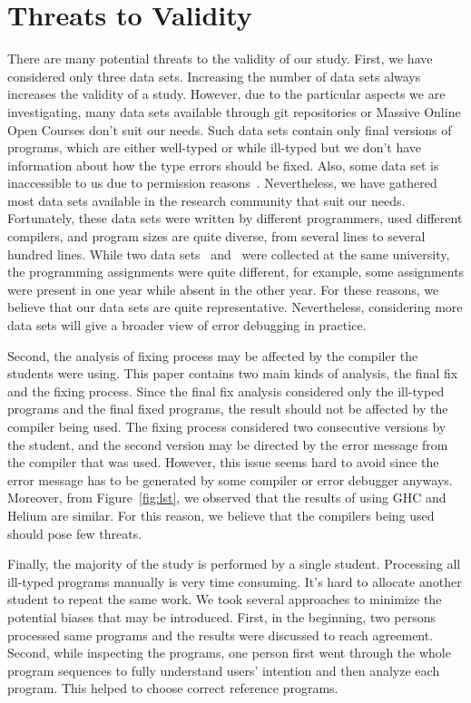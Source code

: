 \documentclass[12pt]{report}	%
\begin{document}
\section{Threats to Validity}
\label{sec:threat}

There are many potential threats to the validity of our study.
First, we have considered only three data sets. Increasing the
number of data sets always increases the validity
of a study. However, due to the particular aspects we are
investigating, many data sets available through git
repositories or Massive Online Open Courses don't
suit our needs. Such data sets contain only final
versions of programs, which are either well-typed or
while ill-typed but we don't have information about
how the type errors should be fixed. Also,
some data set is inaccessible to us due to
permission reasons~\cite{tirronen2015understanding}.
Nevertheless, we have gathered most data sets
available in the research community that suit
our needs. Fortunately, these data sets were written 
by different programmers,
used different compilers, and program sizes are quite
diverse, from several lines to several hundred lines.
While two data sets \benchf\ and \benchs\ were collected
at the same university, the programming assignments
were quite different, for example, some assignments
were present in one year while absent in the other year.
For these reasons, we believe that our data sets are quite
representative. Nevertheless, considering
more data sets will give a broader view of error debugging
in practice.


Second, the analysis of fixing process may be affected
by the compiler the students were using. This paper
contains two main kinds of analysis, the final fix and the
fixing process. Since the final fix analysis
considered only the ill-typed programs and the final fixed
programs, the result should not be affected by the compiler
being used. The fixing process considered two consecutive
versions by the student, and the second version may
be directed by the error message from the compiler that
was used. However, this issue seems hard to avoid since the
error message has to be generated by some compiler or
error debugger anyways. Moreover, from Figure~\ref{fig:lst},
we observed that the results of using GHC and Helium are
similar. For this reason, we believe that the compilers being
used should pose few threats.


Finally, the majority of the study is performed by
a single student. Processing all ill-typed programs
manually is very time consuming.
It's hard to allocate
another student to repeat the same work.
We took 
several approaches to minimize the potential biases that
may be introduced.
First, in the beginning, two persons processed
same programs and the results were discussed to
reach agreement. Second, while inspecting
the programs, one person first went through
the whole program sequences to fully understand
users' intention and then analyze each program.
This helped to choose correct reference programs.
\end{document}
